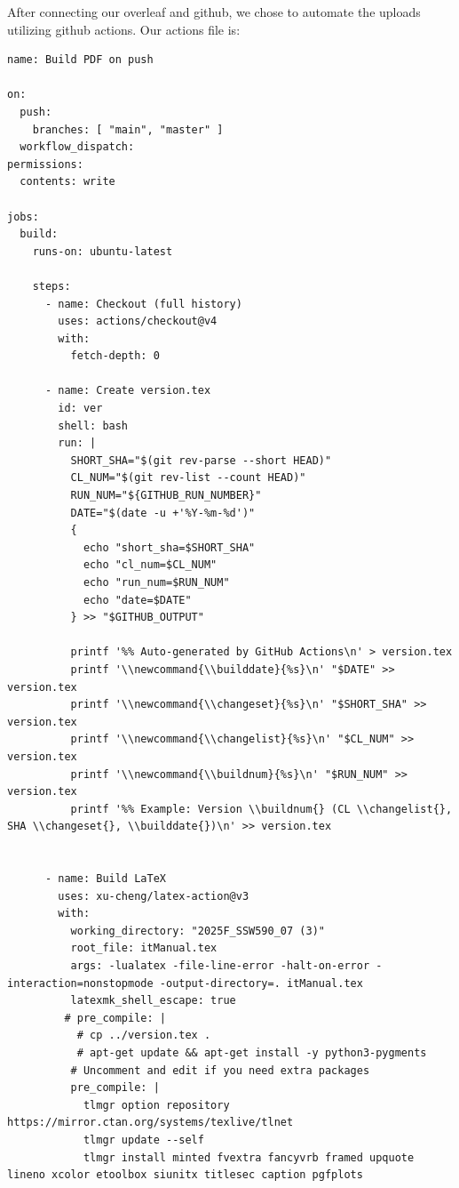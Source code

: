 After connecting our overleaf and github, we chose to automate the uploads utilizing github actions. Our actions file is:
\begin{verbatim}
name: Build PDF on push

on:
  push:
    branches: [ "main", "master" ]
  workflow_dispatch:
permissions:
  contents: write

jobs:
  build:
    runs-on: ubuntu-latest

    steps:
      - name: Checkout (full history)
        uses: actions/checkout@v4
        with:
          fetch-depth: 0

      - name: Create version.tex
        id: ver
        shell: bash
        run: |
          SHORT_SHA="$(git rev-parse --short HEAD)"
          CL_NUM="$(git rev-list --count HEAD)"
          RUN_NUM="${GITHUB_RUN_NUMBER}"
          DATE="$(date -u +'%Y-%m-%d')"
          {
            echo "short_sha=$SHORT_SHA"
            echo "cl_num=$CL_NUM"
            echo "run_num=$RUN_NUM"
            echo "date=$DATE"
          } >> "$GITHUB_OUTPUT"

          printf '%% Auto-generated by GitHub Actions\n' > version.tex
          printf '\\newcommand{\\builddate}{%s}\n' "$DATE" >> version.tex
          printf '\\newcommand{\\changeset}{%s}\n' "$SHORT_SHA" >> version.tex
          printf '\\newcommand{\\changelist}{%s}\n' "$CL_NUM" >> version.tex
          printf '\\newcommand{\\buildnum}{%s}\n' "$RUN_NUM" >> version.tex
          printf '%% Example: Version \\buildnum{} (CL \\changelist{}, SHA \\changeset{}, \\builddate{})\n' >> version.tex


      - name: Build LaTeX
        uses: xu-cheng/latex-action@v3
        with:
          working_directory: "2025F_SSW590_07 (3)"
          root_file: itManual.tex
          args: -lualatex -file-line-error -halt-on-error -interaction=nonstopmode -output-directory=. itManual.tex
          latexmk_shell_escape: true
         # pre_compile: |
           # cp ../version.tex .
           # apt-get update && apt-get install -y python3-pygments
          # Uncomment and edit if you need extra packages
          pre_compile: |
            tlmgr option repository https://mirror.ctan.org/systems/texlive/tlnet
            tlmgr update --self
            tlmgr install minted fvextra fancyvrb framed upquote lineno xcolor etoolbox siunitx titlesec caption pgfplots


\end{verbatim}
